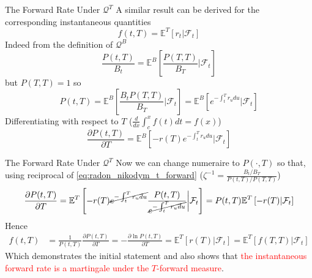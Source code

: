 \documentclass{beamer}
\begin{document}
\begin{frame}{The Forward Rate Under $\mathcal{Q}^T$}
  A similar result can be derived for the corresponding instantaneous quantities
  \begin{equation}
    f(t,T)=\mathbb{E}^T[r_t|\mathcal{F}_t]
  \end{equation}
	\pause
  Indeed from the definition of $\mathcal{Q}^B$
  \begin{equation*}
    \frac{P(t,T)}{B_t}=\mathbb{E}^B\left[\frac{P(T,T)}{B_T}\bigg|\mathcal{F}_t\right]
  \end{equation*}
  but $P(T,T)=1$ so
  \begin{equation*}
    P(t,T)=\mathbb{E}^B\left[\frac{B_tP(T,T)}{B_T}\bigg|\mathcal{F}_t\right]=\mathbb{E}^B\left[e^{-\int_t^Tr_u du}\big|\mathcal{F}_t\right]
  \end{equation*}
	\pause
  Differentiating with respect to $T$ ($\frac{d}{dx}\int_c^x f(t)dt=f(x)$)
  \begin{equation*}
    \frac{\partial P(t,T)}{\partial T}=
    \mathbb{E}^B\left[-r(T)e^{-\int_t^Tr_u du}\big|\mathcal{F}_t\right]
  \end{equation*}
\end{frame}

\begin{frame}{The Forward Rate Under $\mathcal{Q}^T$}
  Now we can change numeraire to $P(\cdot,T)$ so that, using reciprocal of \cref{eq:radon_nikodym_t_forward} ($\zeta^{-1}=\frac{B_t/B_T}{P(t,T)/P(T,T)}$)
  \begin{equation*}
    \frac{\partial P(t,T)}{\partial T}=
    \mathbb{E}^T\left[-r(T)\cancel{e^{-\int_t^Tr_u du}}\frac{P(t,T)}{\cancel{e^{-\int_t^Tr_u du}}}\bigg|\mathcal{F}_t\right]=
    P(t,T)\mathbb{E}^T\left[-r(T)|\mathcal{F}_t\right]
  \end{equation*}
	\pause
  Hence
  \begin{equation*}
    \begin{aligned}
      f(t,T)&=\frac{1}{P(t,T)}\frac{\partial P(t,T)}{\partial T}=
      -\frac{\partial \ln P(t,T)}{\partial T}
      = \mathbb{E}^T\left[r(T)|\mathcal{F}_t\right]=	\mathbb{E}^T\left[f(T,T)|\mathcal{F}_t\right]
    \end{aligned}
  \end{equation*}
  Which demonstrates the initial statement and also shows that \textcolor{red}{the instantaneous forward rate is a martingale under the $T$-forward measure}.
\end{frame}
\end{document}
